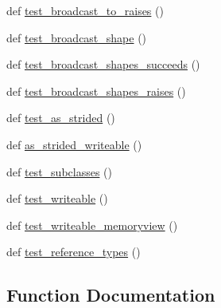 \begin{DoxyCompactItemize}
\item 
def \hyperlink{namespacenumpy_1_1lib_1_1tests_1_1test__stride__tricks_af05f110a6bdd62d10feda429bb12dfb4}{test\+\_\+broadcast\+\_\+to\+\_\+raises} ()
\item 
def \hyperlink{namespacenumpy_1_1lib_1_1tests_1_1test__stride__tricks_a0ffd5009596e53b2511fb3098103a987}{test\+\_\+broadcast\+\_\+shape} ()
\item 
def \hyperlink{namespacenumpy_1_1lib_1_1tests_1_1test__stride__tricks_a2575f4058ab8ca48c74923f599d8f536}{test\+\_\+broadcast\+\_\+shapes\+\_\+succeeds} ()
\item 
def \hyperlink{namespacenumpy_1_1lib_1_1tests_1_1test__stride__tricks_a1e89a96b536ce6f9aaf07b888edcb47e}{test\+\_\+broadcast\+\_\+shapes\+\_\+raises} ()
\item 
def \hyperlink{namespacenumpy_1_1lib_1_1tests_1_1test__stride__tricks_a9fd179426d3dbb2dcf8289032d0bb6bc}{test\+\_\+as\+\_\+strided} ()
\item 
def \hyperlink{namespacenumpy_1_1lib_1_1tests_1_1test__stride__tricks_a92fa62d62e37c090a93b669f5128f86c}{as\+\_\+strided\+\_\+writeable} ()
\item 
def \hyperlink{namespacenumpy_1_1lib_1_1tests_1_1test__stride__tricks_aeb14367304e892d4ca99dd3b0c79da79}{test\+\_\+subclasses} ()
\item 
def \hyperlink{namespacenumpy_1_1lib_1_1tests_1_1test__stride__tricks_a38776896c7e23339eba9961d5e75e15d}{test\+\_\+writeable} ()
\item 
def \hyperlink{namespacenumpy_1_1lib_1_1tests_1_1test__stride__tricks_afed8e94564714613fc8ed176f56ca12f}{test\+\_\+writeable\+\_\+memoryview} ()
\item 
def \hyperlink{namespacenumpy_1_1lib_1_1tests_1_1test__stride__tricks_a97fb613f00cc699dbb80d6e635a06f1e}{test\+\_\+reference\+\_\+types} ()
\end{DoxyCompactItemize}


\subsection{Function Documentation}
\mbox{\label{namespacenumpy_1_1lib_1_1tests_1_1test__stride__tricks_a92fa62d62e37c090a93b669f5128f86c}} 
